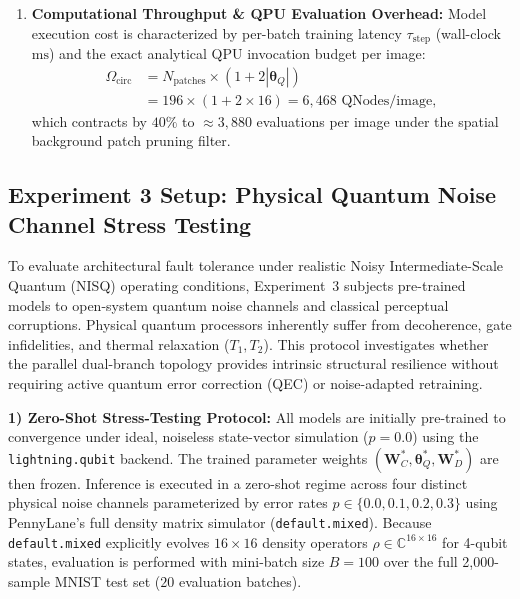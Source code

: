 \documentclass[journal]{IEEEtran}
\begin{document}
\begin{enumerate}
    \item \textbf{Computational Throughput \& QPU Evaluation Overhead:} Model execution cost is characterized by per-batch training latency $\tau_{\mathrm{step}}$ (wall-clock $\mathrm{ms}$) and the exact analytical QPU invocation budget per image:
    \begin{align}
    \Omega_{\mathrm{circ}} &= N_{\mathrm{patches}} \times \left( 1 + 2 |\boldsymbol{\theta}_Q| \right) \nonumber \\
    &= 196 \times (1 + 2 \times 16) = 6{,}468 \text{ QNodes/image},
    \label{eq:qnode_budget_analytical}
    \end{align}
    which contracts by $40\%$ to $\approx 3{,}880$ evaluations per image under the spatial background patch pruning filter.
\end{enumerate}

\subsection{Experiment 3 Setup: Physical Quantum Noise Channel Stress Testing}
\label{subsec:exp3_setup}
To evaluate architectural fault tolerance under realistic Noisy Intermediate-Scale Quantum (NISQ) operating conditions, Experiment~3 subjects pre-trained models to open-system quantum noise channels and classical perceptual corruptions. Physical quantum processors inherently suffer from decoherence, gate infidelities, and thermal relaxation ($T_1, T_2$). This protocol investigates whether the parallel dual-branch topology provides intrinsic structural resilience without requiring active quantum error correction (QEC) or noise-adapted retraining.

\textbf{1) Zero-Shot Stress-Testing Protocol:}
All models are initially pre-trained to convergence under ideal, noiseless state-vector simulation ($p = 0.0$) using the \texttt{lightning.qubit} backend. The trained parameter weights $(\mathbf{W}_C^*, \boldsymbol{\theta}_Q^*, \mathbf{W}_D^*)$ are then frozen. Inference is executed in a zero-shot regime across four distinct physical noise channels parameterized by error rates $p \in \{0.0, 0.1, 0.2, 0.3\}$ using PennyLane's full density matrix simulator (\texttt{default.mixed}). Because \texttt{default.mixed} explicitly evolves $16 \times 16$ density operators $\rho \in \mathbb{C}^{16 \times 16}$ for 4-qubit states, evaluation is performed with mini-batch size $B = 100$ over the full 2,000-sample MNIST test set ($20$ evaluation batches).
\end{document}
